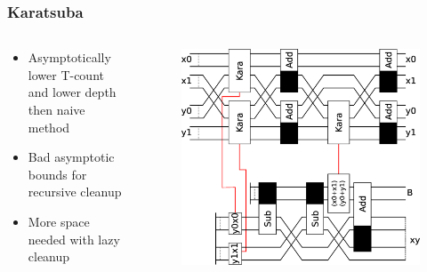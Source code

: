 \documentclass[utf8]{beamer}
\begin{document}
\begin{frame}
  \frametitle{Karatsuba}
  \begin{columns}
    \begin{column}{5cm}
      \begin{itemize}
        \item Asymptotically lower T-count and lower depth then naive method 
        \item Bad asymptotic bounds for recursive cleanup
        \item More space needed with lazy cleanup 
      \end{itemize}
    \end{column}
    \begin{column}{5cm}
      \begin{figure} 
        \includegraphics[width=\linewidth]{diagrams/kara}
      \end{figure}
    \end{column}
  \end{columns}
\end{frame}
\end{document}
